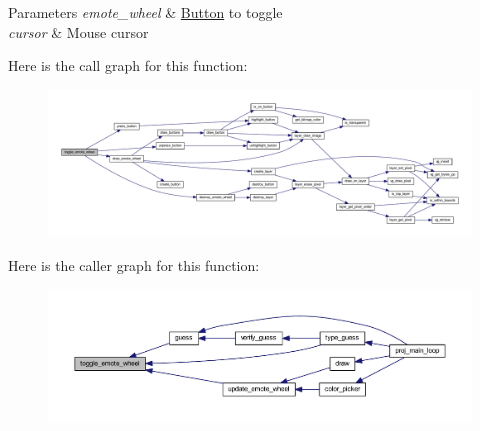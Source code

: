 \begin{DoxyParams}{Parameters}
{\em emote\+\_\+wheel} & \mbox{\hyperlink{struct_button}{Button}} to toggle \\
\hline
{\em cursor} & Mouse cursor \\
\hline
\end{DoxyParams}
Here is the call graph for this function\+:\nopagebreak
\begin{figure}[H]
\begin{center}
\leavevmode
\includegraphics[width=350pt]{group__emote_gab67bd820d159dbce1349586c05aeac11_cgraph}
\end{center}
\end{figure}
Here is the caller graph for this function\+:\nopagebreak
\begin{figure}[H]
\begin{center}
\leavevmode
\includegraphics[width=350pt]{group__emote_gab67bd820d159dbce1349586c05aeac11_icgraph}
\end{center}
\end{figure}
